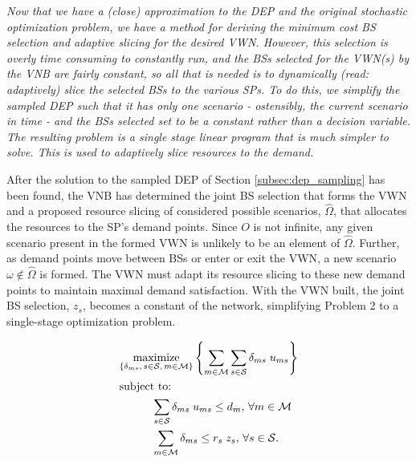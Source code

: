 \documentclass[12pt,dvipsnames]{report}
\begin{document}
\textit{Now that we have a (close) approximation to the DEP and the original stochastic optimization problem, we have a method for deriving the minimum cost BS selection and adaptive slicing for the desired VWN.  However, this selection is overly time consuming to constantly run, and the BSs selected for the VWN(s) by the VNB are fairly constant, so all that is needed is to dynamically (read: adaptively) slice the selected BSs to the various SPs.  To do this, we simplify the sampled DEP such that it has only one scenario - ostensibly, the current scenario in time - and the BSs selected set to be a constant rather than a decision variable.  The resulting problem is a single stage linear program that is much simpler to solve.  This is used to adaptively slice resources to the demand.}

After the solution to the sampled DEP of Section \ref{subsec:dep_sampling} has been found, the VNB has determined the joint BS selection that forms the VWN and a proposed resource slicing of considered possible scenarios, $\hat{\Omega}$, that allocates the resources to the SP's demand points.  Since $O$ is not infinite, any given scenario present in the formed VWN is unlikely to be an element of $\hat{\Omega}$.  Further, as demand points move between BSs or enter or exit the VWN, a new scenario $\omega \notin \hat{\Omega}$ is formed.  The VWN must adapt its resource slicing to these new demand points to maintain maximal demand satisfaction.  With the VWN built, the joint BS selection, $z_s$, becomes a constant of the network, simplifying Problem 2 to a single-stage optimization problem.

\vspace{3mm}
\begin{tcolorbox}[title = Problem 3 (Deterministic Adaptive Slicing)]
\begin{align}
& \underset{\left\{ \substack{
	\delta_{ms},\,	s \in \mathcal{S},\, m \in \mathcal{M}} \right\}} {\text{maximize}}
\left\{ \sum_{m \in \mathcal{M}} \sum_{s \in \mathcal{S}} \delta_{ms} \; u_{ms} \right\} \label{eq:P3}\\
& \text{subject to:}  \nonumber \\
& \hspace{0.4in} \sum_{s \in \mathcal{S}} \delta_{ms} \; u_{ms} \leq d_m,\, \forall m \in \mathcal{M} \label{eq:P3C1}\\
& \hspace{0.4in} \sum_{m \in \mathcal{M}} \delta_{ms} \leq r_s \; z_s,\, \forall s \in \mathcal{S}. \label{eq:P3C2}
\end{align}
\end{tcolorbox}
\end{document}
